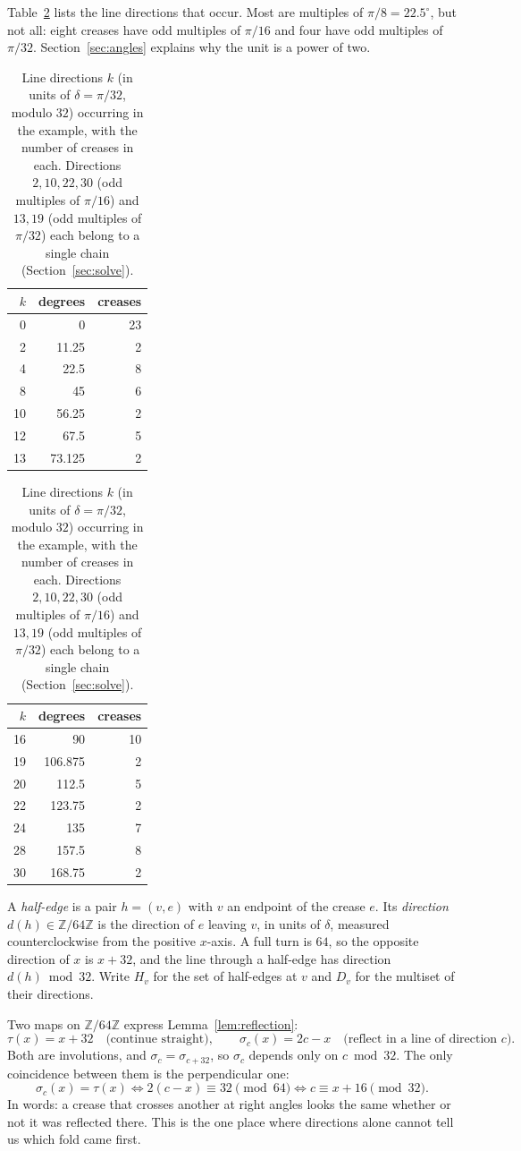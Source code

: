 \documentclass[11pt]{article}
\theoremstyle{definition}
\theoremstyle{remark}
\newcommand{\Z}{\mathbb{Z}}
\newcommand{\ZN}{\Z/64\Z}
\begin{document}
Table~\ref{tab:dirs} lists the line directions that occur. Most are multiples of $\pi/8=22.5^\circ$, but not all: eight creases have odd multiples of $\pi/16$ and four have odd multiples of $\pi/32$. Section~\ref{sec:angles} explains why the unit is a power of two.

\begin{table}[h]
\centering\small
\begin{tabular}{rrr}
\toprule
$k$ & degrees & creases\\
\midrule
0&0&23\\ 2&11.25&2\\ 4&22.5&8\\ 8&45&6\\ 10&56.25&2\\ 12&67.5&5\\ 13&73.125&2\\
\bottomrule
\end{tabular}\qquad
\begin{tabular}{rrr}
\toprule
$k$ & degrees & creases\\
\midrule
16&90&10\\ 19&106.875&2\\ 20&112.5&5\\ 22&123.75&2\\ 24&135&7\\ 28&157.5&8\\ 30&168.75&2\\
\bottomrule
\end{tabular}
\caption{Line directions $k$ (in units of $\delta=\pi/32$, modulo $32$) occurring in the example, with the number of creases in each. Directions $2,10,22,30$ (odd multiples of $\pi/16$) and $13,19$ (odd multiples of $\pi/32$) each belong to a single chain (Section~\ref{sec:solve}).}
\label{tab:dirs}
\end{table}

A \emph{half-edge} is a pair $h=(v,e)$ with $v$ an endpoint of the crease $e$. Its \emph{direction} $d(h)\in\ZN$ is the direction of $e$ leaving $v$, in units of $\delta$, measured counterclockwise from the positive $x$-axis. A full turn is $64$, so the opposite direction of $x$ is $x+32$, and the line through a half-edge has direction $d(h)\bmod 32$. Write $H_v$ for the set of half-edges at $v$ and $D_v$ for the multiset of their directions.

Two maps on $\ZN$ express Lemma~\ref{lem:reflection}:
\begin{equation}\label{eq:maps}
\tau(x)=x+32 \quad\text{(continue straight)}, \qquad \sigma_c(x)=2c-x \quad\text{(reflect in a line of direction $c$)}.
\end{equation}
Both are involutions, and $\sigma_c=\sigma_{c+32}$, so $\sigma_c$ depends only on $c\bmod 32$. The only coincidence between them is the perpendicular one:
\begin{equation}\label{eq:perp}
\sigma_c(x)=\tau(x)\iff 2(c-x)\equiv 32 \pmod{64}\iff c\equiv x+16\pmod{32}.
\end{equation}
In words: a crease that crosses another at right angles looks the same whether or not it was reflected there. This is the one place where directions alone cannot tell us which fold came first.
\end{document}
